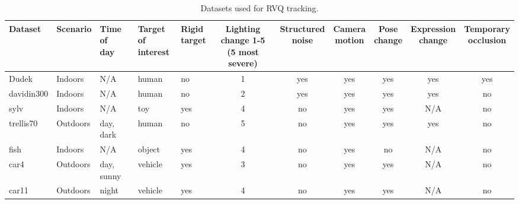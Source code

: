 

\begin{table}[t]
\footnotesize
\begin{tabular}{p{0.6in}|p{0.6in}p{0.6in}p{0.4in}p{0.4in}cccccc}
Dataset 		&Scenario	     &\parbox[c]{0.4in}{\center Time of \\day} 	&\parbox[c]{0.26in}{\center Target of \\interest}  &\parbox{0.3in}{\center Rigid \\target} 	&\parbox{0.4in}{\center Lighting change 1-5 \\(5 most severe)}  	&\parbox{0.5in}{\center Structured \\noise} 	&\parbox{0.4in}{\center Camera \\motion} 	&\parbox{0.3in}{\center Pose \\change} 	&\parbox{0.45in}{\center Expression \\change} 	&\parbox{0.3in}{\center Temporary \\occlusion} 	\\\hline
Dudek 			&Indoors 	     &N/A 			&human 					&no 	&1 	&yes 	&yes 	&yes 	&yes 	&yes 		\\\hline
davidin300 	&Indoors		&N/A			&human					&no	&2	&yes	&yes	&yes	&yes	&no		\\\hline
sylv				&Indoors		&N/A			&toy						&yes	&4	&no	&yes	&yes	&N/A	&no		\\\hline
trellis70	 		&Outdoors 		&day, dark		&human					&no	&5	&no	&yes	&yes	&yes	&no		\\\hline
fish				&Indoors		&N/A			&object					&yes	&4	&no	&yes	&no	&N/A	&no		\\\hline
car4			&Outdoors 		&day, sunny	&vehicle					&yes	&3	&no	&yes	&yes	&N/A	&no		\\\hline
car11			&Outdoors		&night			&vehicle					&yes	&4	&no	&yes	&yes	&N/A	&no		\\\hline
\end{tabular}
\caption{Datasets used for RVQ tracking.}
\label{Tab:datasets_used}
\end{table}


